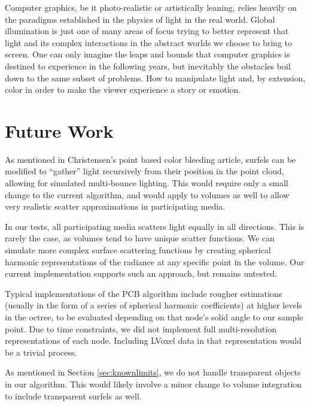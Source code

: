 \documentclass[12pt]{ucthesis}
\begin{document}
Computer graphics, be it photo-realistic or artistically leaning, relies heavily on the paradigms established in the physics of light in the real world.  Global illumination is just one of many areas of focus trying to better represent that light and its complex interactions in the abstract worlds we choose to bring to screen.  One can only imagine the leaps and bounds that computer graphics is destined to experience in the following years, but inevitably the obstacles boil down to the same subset of problems.  How to manipulate light and, by extension, color in order to make the viewer experience a story or emotion.

\chapter{Future Work}


As mentioned in Christensen's point based color bleeding article, surfels can be modified to ``gather'' light recursively from their position in the point cloud, allowing for simulated multi-bounce lighting.  This would require only a small change to the current algorithm, and would apply to volumes as well to allow very realistic scatter approximations in participating media.

\vspace{5mm}

In our tests, all participating media scatters light equally in all directions.  This is rarely the case, as volumes tend to have unique scatter functions.  We can simulate more complex surface scattering functions by creating spherical harmonic representations of the radiance at any specific point in the volume.  Our current implementation supports such an approach, but remains untested.

\vspace{5mm}

Typical implementations of the PCB algorithm include rougher estimations (usually in the form of a series of spherical harmonic coefficients) at higher levels in the octree, to be evaluated depending on that node's solid angle to our sample point.  Due to time constraints, we did not implement full multi-resolution representations of each node.  Including LVoxel data in that representation would be a trivial process.

\vspace{5mm}

As mentioned in Section \ref{sec:knownlimits}, we do not handle transparent objects in our algorithm.  This would likely involve a minor change to volume integration to include transparent surfels as well.
\end{document}
